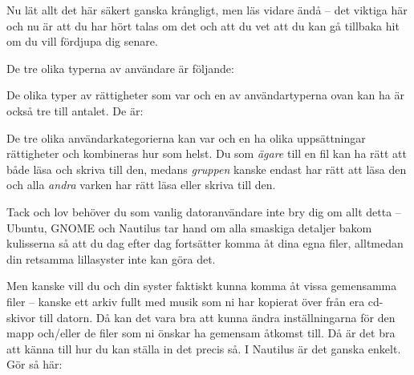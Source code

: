 \documentclass[a4paper,final]{memoir} %
\begin{document}
Nu lät allt det här säkert ganska krångligt, men läs vidare ändå -- det viktiga här och nu är att du har hört talas om det och att du vet att du kan gå tillbaka hit om du vill fördjupa dig senare. 

De tre olika typerna av användare är följande:

\begin{itemize}
\end{itemize}

De olika typer av rättigheter som var och en av användartyperna ovan kan ha är också tre till antalet. De är:

\begin{itemize}
\end{itemize}

De tre olika användarkategorierna kan var och en ha olika uppsättningar rättigheter och kombineras hur som helst. Du som \textit{ägare} till en fil kan ha rätt att både läsa och skriva till den, medans \textit{gruppen} kanske endast har rätt att läsa den och alla \textit{andra} varken har rätt läsa eller skriva till den. 

Tack och lov behöver du som vanlig datoranvändare inte bry dig om allt detta -- Ubuntu, GNOME och Nautilus tar hand om alla smaskiga detaljer bakom kulisserna så att du dag efter dag fortsätter komma åt dina egna filer, alltmedan din retsamma lillasyster inte kan göra det.

Men kanske vill du och din syster faktiskt kunna komma åt vissa gemensamma filer -- kanske ett arkiv fullt med musik som ni har kopierat över från era cd-skivor till datorn. Då kan det vara bra att kunna ändra inställningarna för den mapp och/eller de filer som ni önskar ha gemensam åtkomst till. Då är det bra att känna till hur du kan ställa in det precis så. I Nautilus är det ganska enkelt. Gör så här:
\end{document}
